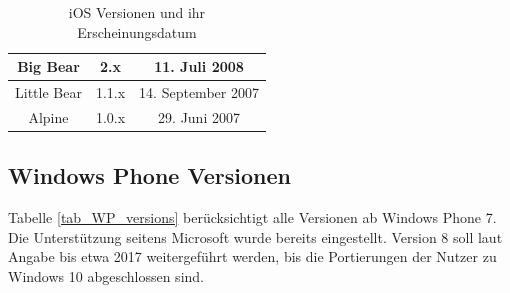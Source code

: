 \begin{table}[htbp]
{\begin{tabular}{|c|c|c|}
			Big Bear                                 & 2.x                                     & 11. Juli 2008                                     \\ \hline
			Little Bear                              & 1.1.x                                   & 14. September 2007                                \\ \hline
			Alpine                                   & 1.0.x                                   & 29. Juni 2007                                     \\ \hline
		\end{tabular}
	}
\caption{iOS Versionen und ihr Erscheinungsdatum}\label{tab_ios_vers}\citep{ios_codenames}
\end{table}

\subsection{Windows Phone Versionen}
Tabelle \ref{tab_WP_versions} berücksichtigt alle Versionen ab Windows Phone 7. Die Unterstützung seitens Microsoft wurde bereits eingestellt. Version 8 soll laut Angabe bis etwa 2017 weitergeführt werden, bis die Portierungen der Nutzer zu Windows 10 abgeschlossen sind.

